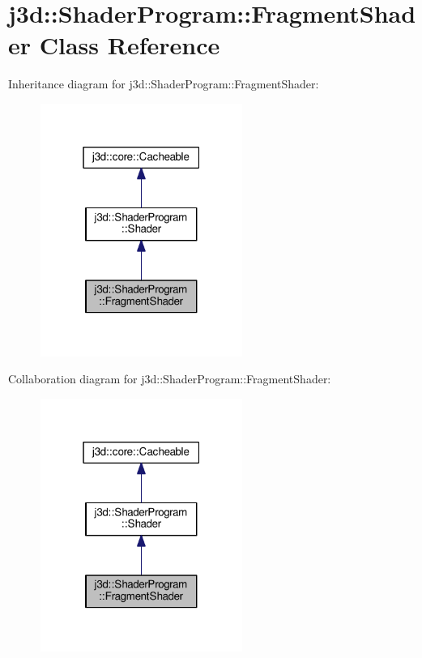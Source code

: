 \hypertarget{classj3d_1_1ShaderProgram_1_1FragmentShader}{}\section{j3d\+:\+:Shader\+Program\+:\+:Fragment\+Shader Class Reference}
\label{classj3d_1_1ShaderProgram_1_1FragmentShader}


Inheritance diagram for j3d\+:\+:Shader\+Program\+:\+:Fragment\+Shader\+:
\nopagebreak
\begin{figure}[H]
\begin{center}
\leavevmode
\includegraphics[width=187pt]{classj3d_1_1ShaderProgram_1_1FragmentShader__inherit__graph}
\end{center}
\end{figure}


Collaboration diagram for j3d\+:\+:Shader\+Program\+:\+:Fragment\+Shader\+:
\nopagebreak
\begin{figure}[H]
\begin{center}
\leavevmode
\includegraphics[width=187pt]{classj3d_1_1ShaderProgram_1_1FragmentShader__coll__graph}
\end{center}
\end{figure}
